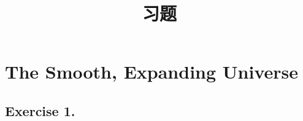 \documentclass[a4paper,UTF8,fleqn]{book}
\title{习题}
\date{}
\numberwithin{equation}{section}
\begin{document}
\allowdisplaybreaks[3]
\maketitle
\tableofcontents
\chapter{The Smooth, Expanding Universe}

\section{Exercise 1.}

% 
% 
% 
% 
% 
% 
% 
% 
\end{document}
